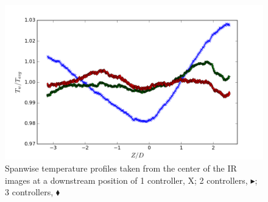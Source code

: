 \begin{figure}[h!]
\centering
\includegraphics[width=\columnwidth]{figures/facility/hemi_multicontrollers_profile.png}
\caption{{\footnotesize Spanwise temperature profiles taken from the center of the IR images at a downstream position of 1 controller, {\color{blue}X};  2 controllers, {\color{green}$\blacktriangleright$}; 3 controllers, {\color{red}$\blacklozenge$}}}
\label{fig:hemi-control}
\end{figure}
